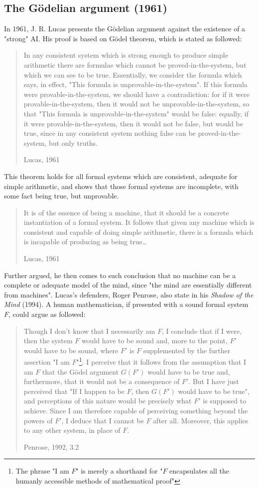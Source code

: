 \subsection{The Gödelian argument (1961)}
In 1961, J. R. Lucas presents the Gödelian argument against the existence of a "strong" AI. His proof is based on Gödel theorem, which is stated as followed:

\blockquote[Lucas, 1961]{In any consistent system which is strong enough to produce simple arithmetic there are formulae which cannot be proved-in-the-system, but which we can see to be true. Essentially, we consider the formula which says, in effect, "This formula is unprovable-in-the-system". If this formula were provable-in-the-system, we should have a contradiction: for if it were provable-in-the-system, then it would not be unprovable-in-the-system, so that "This formula is unprovable-in-the-system" would be false: equally, if it were provable-in-the-system, then it would not be false, but would be true, since in any consistent system nothing false can be proved-in-the-system, but only truths.}
This theorem holds for all formal systems which are consistent, adequate for simple arithmetic, and shows that those formal systems are incomplete, with some fact being true, but unprovable.
\blockquote[Lucas, 1961]{It is of the essence of being a machine, that it should be a concrete instantiation of a formal system. It follows that given any machine which is consistent and capable of doing simple arithmetic, there is a formula which is incapable of producing as being true\dots}

Further argued, he then comes to such conclusion that no machine can be a complete or adequate model of the mind, since "the mind are essentially different from machines". Lucas's defenders, Roger Penrose, also state in his \textit{Shadow of the Mind} (1994). A human mathematician, if presented with a sound formal system $F$, could argue as followed:
\blockquote[Penrose, 1992, 3.2]{Though I don't know that I necessarily am $F$, I conclude that if I were, then the system $F$ would have to be sound and, more to the point, $F'$ would have to be sound, where $F'$ is $F$ supplemented by the further assertion "I am $F$"\footnote{The phrase "I am $F$" is merely a shorthand for "$F$ encapsulates all the humanly accessible methods of mathematical proof"}. I perceive that it follows from the assumption that I am $F$ that the Gödel argument $G(F')$ would have to be true and, furthermore, that it would not be a consequence of $F'$. But I have just perceived that "If I happen to be $F$, then $G(F')$ would have to be true", and perceptions of this nature would be precisely what $F'$ is supposed to achieve. Since I am therefore capable of perceiving something beyond the powers of $F'$, I deduce that I cannot be $F$ after all. Moreover, this applies to any other system, in place of $F$.}

